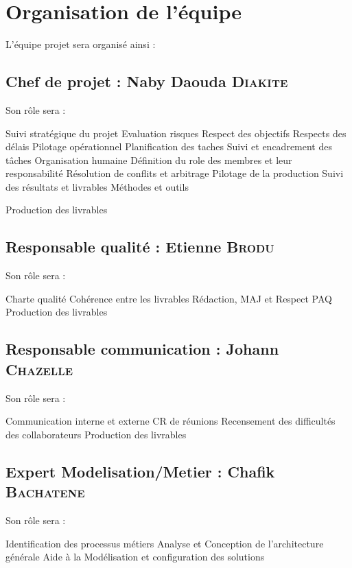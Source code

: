{\section{Organisation de l'équipe}

L’équipe projet sera organisé ainsi :
\subsection{Chef de projet : Naby Daouda \textsc{Diakite}}

Son rôle sera :

    Suivi stratégique du projet
        Evaluation risques
        Respect des objectifs
        Respects des délais
    Pilotage opérationnel
        Planification des taches
        Suivi et encadrement des tâches
    Organisation humaine
        Définition du role des membres et leur responsabilité
        Résolution de conflits et arbitrage
    Pilotage de la production
        Suivi des résultats et livrables
        Méthodes et outils

    Production des livrables

\subsection{Responsable qualité : Etienne \textsc{Brodu}}

Son rôle sera :

    Charte qualité
    Cohérence entre les livrables
    Rédaction, MAJ  et Respect PAQ
    Production des livrables


\subsection{Responsable communication : Johann \textsc{Chazelle}}

Son rôle sera :

    Communication interne et externe
    CR de réunions
    Recensement des difficultés des collaborateurs
    Production des livrables



\subsection{Expert Modelisation/Metier : Chafik \textsc{Bachatene}}

Son rôle sera :

    Identification des processus métiers
    Analyse et Conception de l’architecture générale
    Aide à la Modélisation et configuration des solutions 


}
